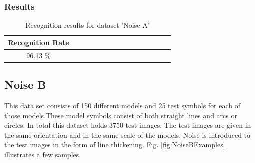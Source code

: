 \subsubsection{Results}
\begin{table}[H]
\centering
\caption{Recognition results for dataset 'Noise A'}
\begin{tabular}{ccccccccccccccc}
  \hline
      Recognition Rate \\
  \hline
      96.13 \% \\
  \hline
\end{tabular}
\end{table}
\vspace{49.3mm}

\subsection{Noise B}
This data set consists of 150 different models and 25 test symbols for each of those models.These model symbols consist of both straight lines and arcs or circles. In total this dataset holds 3750 test images. The test images are given in the same orientation and in the same scale of the models. Noise is introduced to the test images in the form of line thickening. Fig. \ref{fig:NoiseBExamples} illustrates a few samples.

